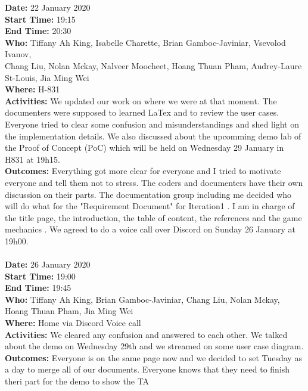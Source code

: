 \documentclass[12pt]{article}
\begin{document}
{\bf Date:} 22 January 2020\\
{\bf Start Time:} 19:15\\
{\bf End Time:} 20:30\\
{\bf Who:} Tiffany Ah King, Isabelle Charette, Brian Gamboc-Javiniar, Vsevolod Ivanov,\\
Chang Liu, Nolan Mckay, Nalveer Moocheet, Hoang Thuan Pham, Audrey-Laure St-Louis, Jia Ming Wei\\
{\bf Where:} H-831\\
{\bf Activities:} We updated our work on where we were at that moment. The documenters were supposed to learned LaTex and to review  the user cases. Everyone tried to clear some confusion and misunderstandings and shed light on the implementation details. We also discussed about the upcomming demo lab of the Proof of Concept (PoC) which will be held on Wednesday 29 January in H831 at 19h15.\\
{\bf Outcomes:} Everything got more clear for everyone and I tried to motivate everyone and tell them not to stress. The coders and documenters have their own discussion on their parts. The documentation group including me decided who will do what for the "Requirement Document" for Iteration1 . I am in charge of the title page, the introduction, the table of content, the references and the game mechanics . We agreed to do a voice call over Discord on Sunday 26 January at 19h00.\\ \\ 


{\bf Date:} 26 January 2020\\
{\bf Start Time:} 19:00\\
{\bf End Time:} 19:45\\
{\bf Who:} Tiffany Ah King, Brian Gamboc-Javiniar,
Chang Liu, Nolan Mckay, Hoang Thuan Pham, Jia Ming Wei\\
{\bf Where:} Home via Discord Voice call\\
{\bf Activities:} We cleared any confusion and answered to each other. We talked about the demo on Wednesday 29th and we streamed on some user case diagram.\\
{\bf Outcomes:} Everyone is on the same page now and we decided to set Tuesday as a day to merge all of our documents. Everyone knows that they need to finish theri part for the demo to show the TA\\

\newpage
\end{document}
